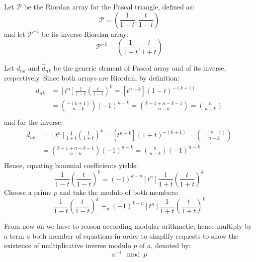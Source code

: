 \documentclass[11pt,a4paper]{article} %
\begin{document}
    Let $\mathcal{P}$ be the Riordan array for the Pascal triangle,
    defined as:
    \begin{displaymath} 
        \mathcal{P} = \left(\frac{1}{1-t}, \frac{t}{1-t}  \right)
    \end{displaymath} 
    and let $\mathcal{P}^{-1}$ be its inverse Riordan array:
    \begin{displaymath} 
        \mathcal{P}^{-1} = \left(\frac{1}{1+t}, \frac{t}{1+t}  \right)
    \end{displaymath} 
    
    Let $d_{nk}$ and $\hat{d}_{nk}$ be the generic element of Pascal
    array and of its inverse, respectively. Since both arrays are
    Riordan, by definition:
    \begin{displaymath}
        \begin{split}
            d_{nk} &= [t^n]\frac{1}{1-t}\left(\frac{t}{1-t}\right)^k = [t^{n-k}](1-t)^{-(k+1)} \\
                &= {{-(k+1)} \choose {n-k}}(-1)^{n-k} = {{k+1 +n-k -1} \choose {n-k}} = {{n} \choose {n-k}} \\
        \end{split}
    \end{displaymath}
    and for the inverse:
    \begin{displaymath}
      \begin{split}
        \hat{d}_{nk} &= [t^n]\frac{1}{1+t}\left(\frac{t}{1+t}\right)^k = [t^{n-k}](1+t)^{-(k+1)} = 
        {{-(k+1)} \choose {n-k}} \\
        &= {{k+1 +n-k -1} \choose {n-k}} (-1)^{n-k} = {{n} \choose {n-k}} (-1)^{n-k}\\
      \end{split}
    \end{displaymath}
    Hence, equating binomial coefficients yields:
    \begin{displaymath}
      [t^n]\frac{1}{1-t}\left(\frac{t}{1-t}\right)^k = (-1)^{k-n}[t^n]\frac{1}{1+t}\left(\frac{t}{1+t}\right)^k 
    \end{displaymath}
    Choose a prime $p$ and take the modulo of both members:
    \begin{displaymath}
      [t^n]\frac{1}{1-t}\left(\frac{t}{1-t}\right)^k \equiv_{p} (-1)^{k-n}[t^n]\frac{1}{1+t}\left(\frac{t}{1+t}\right)^k 
    \end{displaymath}

    From now on we have to reason according modular arithmetic, hence
    multiply by a term $a$ both member of equations in order to
    simplify requests to show the existence of multiplicative inverse
    modulo $p$ of $a$, denoted by: $$a^{-1}\mod p$$
\end{document}
